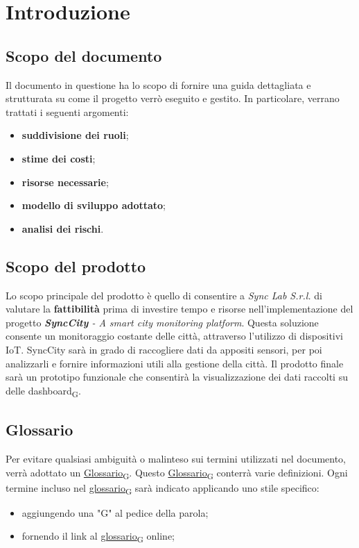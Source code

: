 \section{Introduzione}
\setcounter{subsection}{0}
\subsection{Scopo del documento}
Il documento in questione ha lo scopo di fornire una guida dettagliata e strutturata su come il progetto verrò eseguito e gestito. In particolare, verrano trattati i seguenti argomenti:
\begin{itemize}
	\item \textbf{suddivisione dei ruoli};
	\item \textbf{stime dei costi};
	\item \textbf{risorse necessarie};
	\item \textbf{modello di sviluppo adottato};
	\item \textbf{analisi dei rischi}.
\end{itemize}

\subsection{Scopo del prodotto}
Lo scopo principale del prodotto è quello di consentire a \textit{Sync Lab S.r.l.} di valutare la \textbf{fattibilità} prima di investire tempo e risorse nell'implementazione del progetto  \textit{\textbf{SyncCity} - A smart city monitoring platform}. Questa soluzione consente un monitoraggio costante delle città, attraverso l'utilizzo di dispositivi IoT. SyncCity sarà in grado di raccogliere dati da appositi sensori, per poi analizzarli e fornire informazioni utili alla gestione della città. Il prodotto finale sarà un prototipo funzionale che consentirà la visualizzazione dei dati raccolti su delle {dashboard\textsubscript{G}}.

\subsection{Glossario}
Per evitare qualsiasi ambiguità o malinteso sui termini utilizzati nel documento, verrà adottato un \href{https://7last.github.io/docs/rtb/documentazione-interna/glossario#glossario}{Glossario\textsubscript{G}}. Questo \href{https://7last.github.io/docs/rtb/documentazione-interna/glossario#glossario}{Glossario\textsubscript{G}} conterrà varie definizioni. Ogni termine incluso nel \href{https://7last.github.io/docs/rtb/documentazione-interna/glossario#glossario}{glossario\textsubscript{G}} sarà indicato applicando uno stile specifico:
\begin{itemize}
	\item aggiungendo una "G" al pedice della parola;
	\item fornendo il link al \href{https://7last.github.io/docs/rtb/documentazione-interna/glossario\#glossario}{glossario\textsubscript{G}} online;
\end{itemize}

